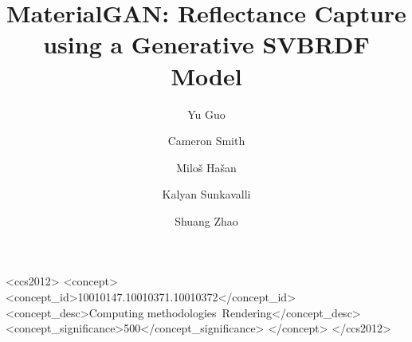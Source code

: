 \documentclass[acmtog,screen]{acmart}
\title{MaterialGAN: Reflectance Capture using a Generative SVBRDF Model}
\author{Yu Guo}
\affiliation{\institution{University of California, Irvine}}
\author{Cameron Smith}
\affiliation{\institution{Adobe Research}}
\author{Milo\v{s} Ha\v{s}an}
\affiliation{\institution{Adobe Research}}
\author{Kalyan Sunkavalli}
\affiliation{\institution{Adobe Research}}
\author{Shuang Zhao}
\affiliation{\institution{University of California, Irvine}}
\begin{document}
    
    
	\begin{CCSXML}
		<ccs2012>
		  <concept>
    		<concept_id>10010147.10010371.10010372</concept_id>
    		<concept_desc>Computing methodologies~Rendering</concept_desc>
        	<concept_significance>500</concept_significance>
    	  </concept>
		</ccs2012>
	\end{CCSXML}
    \maketitle
    
    
    
    
    
    
    
    
    
\end{document}
